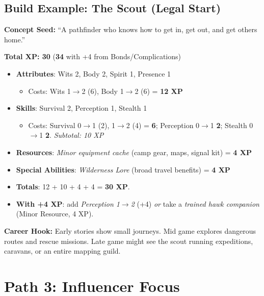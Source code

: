 \subsection*{Build Example: The Scout (Legal Start)}

\textbf{Concept Seed:} ``A pathfinder who knows how to get in, get out, and get others home.''

\medskip

\noindent\textbf{Total XP: 30} \quad (\textbf{34} with +4 from Bonds/Complications)

\begin{itemize}
\item \textbf{Attributes}: Wits 2, Body 2, Spirit 1, Presence 1
  \begin{itemize}
  \item Costs: Wits 1$\to$2 (6), Body 1$\to$2 (6) = \textbf{12 XP}
  \end{itemize}
\item \textbf{Skills}: Survival 2, Perception 1, Stealth 1
  \begin{itemize}
  \item Costs: Survival 0$\to$1 (2), 1$\to$2 (4) = \textbf{6};  
        Perception 0$\to$1 \textbf{2};  
        Stealth 0$\to$1 \textbf{2}.  
        \emph{Subtotal: 10 XP}
  \end{itemize}
\item \textbf{Resources}: \emph{Minor equipment cache} (camp gear, maps, signal kit) = \textbf{4 XP}
\item \textbf{Special Abilities}: \emph{Wilderness Lore} (broad travel benefits) = \textbf{4 XP}
\item \textbf{Totals}: 12 + 10 + 4 + 4 = \textbf{30 XP}.
\item \textbf{With +4 XP}: add \emph{Perception 1$\to$2} (+4) \emph{or} take a \emph{trained hawk companion} (Minor Resource, 4 XP).
\end{itemize}

\noindent\textbf{Career Hook:} Early stories show small journeys. Mid game explores
dangerous routes and rescue missions. Late game might see the scout running
expeditions, caravans, or an entire mapping guild.


\section{Path 3: Influencer Focus}
\label{sec:xp-influencer-path}

